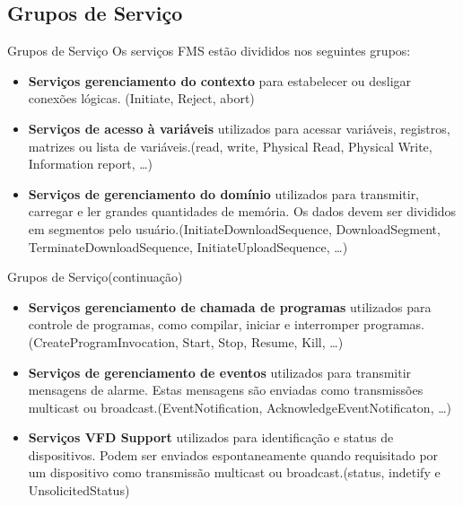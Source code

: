 \documentclass{beamer}
\begin{document}
\subsection{Grupos de Serviço}
\begin{frame}{Grupos de Serviço}
Os serviços FMS estão divididos nos seguintes grupos:
\begin{itemize}
\pause \item \textbf{Serviços gerenciamento do contexto} para estabelecer ou desligar conexões lógicas. (Initiate, Reject, abort)

\pause \item \textbf{Serviços de acesso à variáveis} utilizados para acessar variáveis, registros, matrizes ou lista de variáveis.(read, write, Physical Read, Physical Write, Information report, \ldots)

\pause \item \textbf{Serviços de gerenciamento do domínio} utilizados para transmitir, carregar e ler grandes quantidades de memória. Os dados devem ser divididos em segmentos pelo usuário.(InitiateDownloadSequence, DownloadSegment, TerminateDownloadSequence, InitiateUploadSequence, \ldots)

\end{itemize}

\end{frame}

\begin{frame}{Grupos de Serviço(continuação)}

\begin{itemize}
\item \textbf{Serviços gerenciamento de chamada de programas} utilizados para controle de programas, como compilar, iniciar e interromper programas.(CreateProgramInvocation, Start, Stop, Resume, Kill, \ldots)


\pause \item \textbf{Serviços de gerenciamento de eventos} utilizados para transmitir mensagens de alarme. Estas mensagens são enviadas como transmissões multicast ou broadcast.(EventNotification, AcknowledgeEventNotificaton, \ldots)

\pause \item \textbf{Serviços VFD Support} utilizados para identificação e status de dispositivos. Podem ser enviados espontaneamente quando requisitado por um dispositivo como transmissão multicast ou broadcast.(status, indetify e UnsolicitedStatus)
\end{itemize}
\end{frame}
\end{document}
